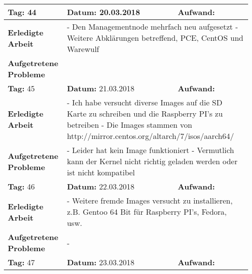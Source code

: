 \begin{longtable}{|p{5cm}|p{5cm}|p{6cm}|}
\rowcolor{heading}\textbf{Tag:} 44 & \textbf{Datum:} 20.03.2018 & \textbf{Aufwand:} \\ \hline
\textbf{Erledigte Arbeit} & \multicolumn{2}{p{11cm}|}{- Den Managementnode mehrfach neu aufgesetzt \newline
- Weitere Abklärungen betreffend, PCE, CentOS und Warewulf} \\ \hline
\textbf{Aufgetretene Probleme} & \multicolumn{2}{p{11cm}|}{} \\ \hline
\rowcolor{heading}\textbf{Tag:} 45 & \textbf{Datum:} 21.03.2018 & \textbf{Aufwand:} \\ \hline
\textbf{Erledigte Arbeit} & \multicolumn{2}{p{11cm}|}{- Ich habe versucht diverse Images auf die SD Karte zu schreiben und die Raspberry PI's zu betreiben \newline
- Die Images stammen von http://mirror.centos.org/altarch/7/isos/aarch64/} \\ \hline
\textbf{Aufgetretene Probleme} & \multicolumn{2}{p{11cm}|}{- Leider hat kein Image funktioniert \newline
- Vermutlich kann der Kernel nicht richtig geladen werden oder ist nicht kompatibel} \\ \hline
\rowcolor{heading}\textbf{Tag:} 46 & \textbf{Datum:} 22.03.2018 & \textbf{Aufwand:} \\ \hline
\textbf{Erledigte Arbeit} & \multicolumn{2}{p{11cm}|}{- Weitere fremde Images versucht zu installieren, z.B. Gentoo 64 Bit für Raspberry PI's, Fedora, usw.} \\ \hline
\textbf{Aufgetretene Probleme} & \multicolumn{2}{p{11cm}|}{-} \\ \hline
\rowcolor{heading}\textbf{Tag:} 47 & \textbf{Datum:} 23.03.2018 & \textbf{Aufwand:} \\ \hline

\end{longtable}
